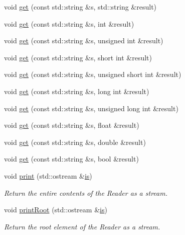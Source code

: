 \begin{DoxyCompactItemize}
\item 
void \mbox{\hyperlink{classADATXML_1_1XMLReader_a5ed2bbc9de7ba505e6ce37c1a5f90fee}{get}} (const std\+::string \&s, std\+::string \&result)
\item 
void \mbox{\hyperlink{classADATXML_1_1XMLReader_a39ab72e2e614e1baed6ac3de0ce9cdca}{get}} (const std\+::string \&s, int \&result)
\item 
void \mbox{\hyperlink{classADATXML_1_1XMLReader_aa716f255bed8a98d555abcf5509d75cf}{get}} (const std\+::string \&s, unsigned int \&result)
\item 
void \mbox{\hyperlink{classADATXML_1_1XMLReader_a235808802ae29fa06b6fd441f7e50ac5}{get}} (const std\+::string \&s, short int \&result)
\item 
void \mbox{\hyperlink{classADATXML_1_1XMLReader_ac7b357f5d7f8b71ad0cd98c37283e2f8}{get}} (const std\+::string \&s, unsigned short int \&result)
\item 
void \mbox{\hyperlink{classADATXML_1_1XMLReader_a6b20ab012a431d51ee5bfd7b40eee3fb}{get}} (const std\+::string \&s, long int \&result)
\item 
void \mbox{\hyperlink{classADATXML_1_1XMLReader_ad9e43f867d48ac2b39291e2af9ec6b4a}{get}} (const std\+::string \&s, unsigned long int \&result)
\item 
void \mbox{\hyperlink{classADATXML_1_1XMLReader_a5b96d00a5503d62acd8cfbb296e6b586}{get}} (const std\+::string \&s, float \&result)
\item 
void \mbox{\hyperlink{classADATXML_1_1XMLReader_ac5f530295603b483a1b63f3b0c6e7eba}{get}} (const std\+::string \&s, double \&result)
\item 
void \mbox{\hyperlink{classADATXML_1_1XMLReader_ae3ba71a241315a5e90ba745fdc7e045b}{get}} (const std\+::string \&s, bool \&result)
\item 
void \mbox{\hyperlink{classADATXML_1_1XMLReader_a72513fe6f299e02428bdf4d225163f50}{print}} (std\+::ostream \&\mbox{\hyperlink{x_8cc_a81abbbdef81e25584a2eab888e643d3d}{is}})
\begin{DoxyCompactList}\small\item\em Return the entire contents of the Reader as a stream. \end{DoxyCompactList}\item 
void \mbox{\hyperlink{classADATXML_1_1XMLReader_a732a08c1605f8c01663105bb3586b575}{print\+Root}} (std\+::ostream \&\mbox{\hyperlink{x_8cc_a81abbbdef81e25584a2eab888e643d3d}{is}})
\begin{DoxyCompactList}\small\item\em Return the root element of the Reader as a stream. \end{DoxyCompactList}\item 

\end{DoxyCompactItemize}
